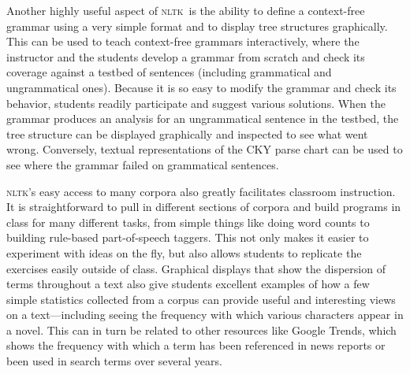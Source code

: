 \documentclass[11pt]{article}
\newcommand{\NLTK}{\textsc{nltk}}
\begin{document}
Another highly useful aspect of \NLTK\ is the ability to define a
context-free grammar using a very simple format and to display tree
structures graphically. This can be used to teach context-free
grammars interactively, where the instructor and the students develop
a grammar from scratch and check its coverage against a testbed of
sentences (including grammatical and ungrammatical ones). Because it
is so easy to modify the grammar and check its behavior, students
readily participate and suggest various solutions. When the grammar
produces an analysis for an ungrammatical sentence in the testbed, the
tree structure can be displayed graphically and inspected to see what
went wrong. Conversely, textual representations of the CKY parse chart
can be used to see where the grammar failed on grammatical sentences.

\NLTK's easy access to many corpora also greatly facilitates classroom
instruction. It is straightforward to pull in different sections of
corpora and build programs in class for many different tasks, from
simple things like doing word counts to building rule-based
part-of-speech taggers. This not only makes it easier to experiment
with ideas on the fly, but also allows students to replicate the
exercises easily outside of class. Graphical displays that show the
dispersion of terms throughout a text also give students excellent
examples of how a few simple statistics collected from a corpus can
provide useful and interesting views on a text---including seeing the
frequency with which various characters appear in a novel. This can in
turn be related to other resources like Google Trends, which shows the
frequency with which a term has been referenced in news reports or
been used in search terms over several years.

% 

\end{document}
